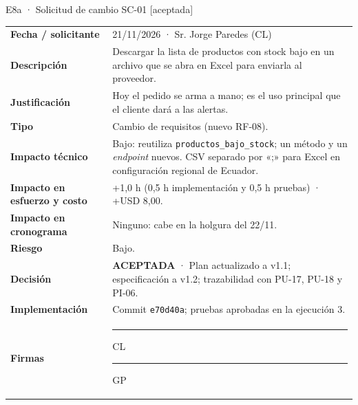 \documentclass[11pt,a4paper]{article}
\newcommand{\cod}[1]{\texttt{\small #1}}
\begin{document}
\begin{evidencia}{E8a · Solicitud de cambio SC-01 [aceptada]}
\small
\begin{tabularx}{\linewidth}{@{}P{3.4cm}L@{}}
\toprule
\textbf{Fecha / solicitante} & 21/11/2026 · Sr. Jorge Paredes (CL) \\
\textbf{Descripción} & Descargar la lista de productos con stock bajo en un archivo que se abra en Excel para enviarla al proveedor. \\
\textbf{Justificación} & Hoy el pedido se arma a mano; es el uso principal que el cliente dará a las alertas. \\
\textbf{Tipo} & Cambio de requisitos (nuevo RF-08). \\
\textbf{Impacto técnico} & Bajo: reutiliza \cod{productos\_bajo\_stock}; un método y un \emph{endpoint} nuevos. CSV separado por «;» para Excel en configuración regional de Ecuador. \\
\textbf{Impacto en esfuerzo y costo} & +1,0 h (0,5 h implementación y 0,5 h pruebas) · +USD 8,00. \\
\textbf{Impacto en cronograma} & Ninguno: cabe en la holgura del 22/11. \\
\textbf{Riesgo} & Bajo. \\
\textbf{Decisión} & \textbf{ACEPTADA} · Plan actualizado a v1.1; especificación a v1.2; trazabilidad con PU-17, PU-18 y PI-06. \\
\textbf{Implementación} & Commit \cod{e70d40a}; pruebas aprobadas en la ejecución 3. \\
\textbf{Firmas} & \rule{3.8cm}{0.4pt} CL \qquad \rule{3.8cm}{0.4pt} GP \\
\bottomrule
\end{tabularx}
\end{evidencia}
\end{document}
